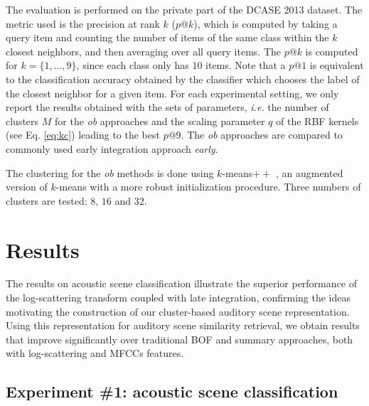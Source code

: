 \documentclass[journal]{IEEEtran}
\newcommand{\ja}[1]{\textcolor{magenta}{Joakim : #1}}
\begin{document}
The evaluation is performed on the private part of the DCASE 2013 dataset. The metric used is the precision at rank $k$ ($p@k$), which is computed by taking a query item and counting the number of items of the same class within the $k$ closest neighbors, and then averaging over all query items. The $p@k$ is computed for $k=\lbrace 1,\ldots,9\rbrace$, since each class only has $10$ items. Note that a $p@1$ is equivalent to the classification accuracy obtained by the classifier which chooses the label of the closest neighbor for a given item. For each experimental setting, we only report the results obtained with the sets of parameters, \emph{i.e.} the number of clusters $M$ for the \emph{ob} approaches and the scaling parameter $q$ of the RBF kernels (see Eq. \ref{eq:kc}) leading to the best $p@9$. The \emph{ob} approaches are compared to commonly used early integration approach \emph{early}. %

The clustering for the \emph{ob} methods is done using $k$-means$++$ \cite{arthur2007k}, an augmented version of $k$-means with a more robust initialization procedure. Three numbers of clusters are tested: $8$, $16$ and $32$. 


\section{Results \label{sec:results}}

The results on acoustic scene classification illustrate the superior performance of the log-scattering transform coupled with late integration, confirming the ideas motivating the construction of our cluster-based auditory scene representation. Using this representation for auditory scene similarity retrieval, we obtain results that improve significantly over traditional BOF and summary approaches, both with log-scattering and MFCCs features.

\subsection{Experiment \#1: acoustic scene classification}

\end{document}
